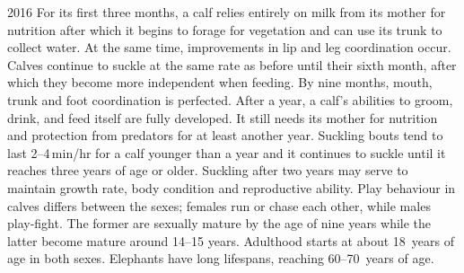 \begin{exercise}
\begin{quoted}{ 2016 \cite[]{Sukumar2003}}
For its first three months, a calf relies entirely on milk from its mother for nutrition after which it begins to forage for vegetation and can use its trunk to collect water.  At the same time, improvements in lip and leg coordination occur.  Calves continue to suckle at the same rate as before until their sixth month, after which they become more independent when feeding.  By nine months, mouth, trunk and foot coordination is perfected.  After a year, a calf's abilities to groom, drink, and feed itself are fully developed.  It still needs its mother for nutrition and protection from predators for at least another year.  Suckling bouts tend to last 2--4\,min/hr for a calf younger than a year and it continues to suckle until it reaches three years of age or older.  Suckling after two years may serve to maintain growth rate, body condition and reproductive ability.  Play behaviour in calves differs between the sexes; females run or chase each other, while males play-fight. The former are sexually mature by the age of nine years while the latter become mature around 14--15 years.  Adulthood starts at about 18~years of age in both sexes.  Elephants have long lifespans, reaching 60--70~years of age.
\end{quoted}
\end{exercise}






